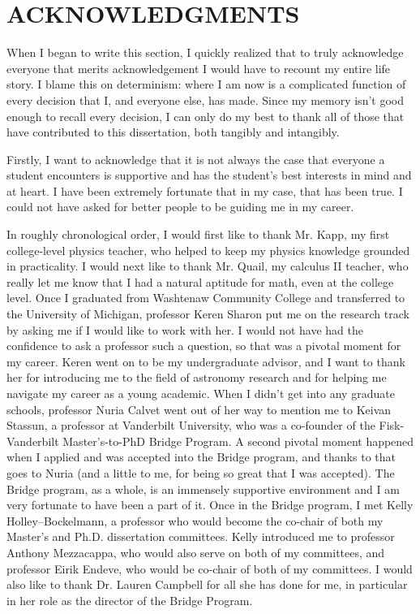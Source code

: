 
\chapter*{ACKNOWLEDGMENTS}
\vspace{7mm}

\begin{doublespace}

When I began to write this section, I quickly realized that to truly
acknowledge everyone that merits acknowledgement I would have to recount
my entire life story.
I blame this on determinism: where I am now is a complicated function
of every decision that I, and everyone else, has made.
Since my memory isn't good enough to recall every decision, I can only do my
best to thank all of those that have contributed to this dissertation,
both tangibly and intangibly.

Firstly, I want to acknowledge that it is not always the case that everyone
a student encounters is supportive and has the student's best interests
in mind and at heart.
I have been extremely fortunate that in my case, that has been true.
I could not have asked for better people to be guiding me in my career.

In roughly chronological order, I would first like to thank Mr. Kapp,
my first college-level physics teacher, who
helped to keep my physics knowledge grounded in practicality.
I would next like to thank Mr. Quail, my calculus II teacher,
who really let me know that I had
a natural aptitude for math, even at the college level.
Once I graduated from Washtenaw Community College and transferred to the
University of Michigan, professor Keren Sharon put me on the research track
by asking me if I would like to work with her.
I would not have had the confidence to ask a professor such a question,
so that was a pivotal moment for my career.
Keren went on to be my undergraduate advisor, and I want to thank her for
introducing me to the field of astronomy research and for
helping me navigate my career as a young academic.
When I didn't get into any graduate schools, professor Nuria Calvet went out
of her way to mention me to Keivan Stassun, a professor at
Vanderbilt University,
who was a co-founder of the Fisk-Vanderbilt Master's-to-PhD Bridge Program.
A second pivotal moment happened when I applied and was accepted into the
Bridge program, and thanks to that goes to Nuria (and a little to me,
for being so great that I was accepted).
The Bridge program, as a whole, is an immensely supportive environment
and I am very fortunate to have been a part of it.
Once in the Bridge program,
I met Kelly Holley--Bockelmann, a professor who would become the
co-chair of both my Master's and Ph.D. dissertation committees.
Kelly introduced me to professor Anthony Mezzacappa,
who would also serve on both of my
committees, and professor Eirik Endeve,
who would be co-chair of both of my committees.
I would also like to thank Dr. Lauren Campbell for all she has done for
me, in particular in her role as the director of the Bridge Program.


\end{doublespace}
